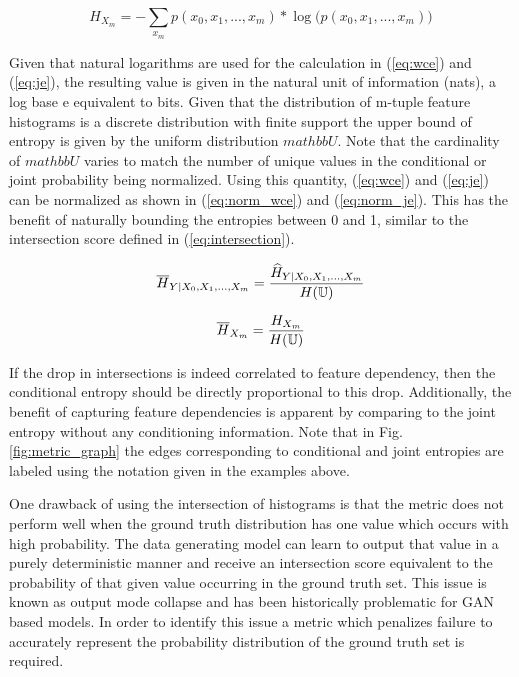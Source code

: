 \begin{equation}
\label{eq:je}
{H}_{X_m} = -\sum_{x_m} p(x_0, x_1,...,x_m)  * \log \big({{p(x_0,x_1,...,x_m)}}\big)
\end{equation}

Given that natural logarithms are used for the calculation in (\ref{eq:wce}) and (\ref{eq:je}), the resulting value is given in the natural unit of information (nats), a log base e equivalent to bits. Given that the distribution of m-tuple feature histograms is a discrete distribution with finite support the upper bound of entropy is given by the uniform distribution $mathbb{U}$. Note that the cardinality of $mathbb{U}$ varies to match the number of unique values in the conditional or joint probability being normalized. Using this quantity, (\ref{eq:wce}) and (\ref{eq:je}) can be normalized as shown in (\ref{eq:norm_wce}) and (\ref{eq:norm_je}). This has the benefit of naturally bounding the entropies between 0 and 1, similar to the intersection score defined in (\ref{eq:intersection}).

\begin{equation}
\label{eq:norm_wce}
\overline{H}_{Y|X_0, X_1, ..., X_m} = {{\widehat{H}_{Y|X_0, X_1, ..., X_m}} \over{ H(\mathbb{U})}}
\end{equation}

\begin{equation}
\label{eq:norm_je}
\overline{H}_{X_m} = {{{H}_{X_m}} \over{ H(\mathbb{U})}}
\end{equation}

If the drop in intersections is indeed correlated to feature dependency, then the conditional entropy should be directly proportional to this drop. Additionally, the benefit of capturing feature dependencies is apparent by comparing to the joint entropy without any conditioning information. Note that in Fig. \ref{fig:metric_graph} the edges corresponding to conditional and joint entropies are labeled using the notation given in the examples above.

One drawback of using the intersection of histograms is that the metric does not perform well when the ground truth distribution has one value which occurs with high probability. The data generating model can learn to output that value in a purely deterministic manner and receive an intersection score equivalent to the probability of that given value occurring in the ground truth set. This issue is known as output mode collapse and has been historically problematic for GAN based models. In order to identify this issue a metric which penalizes failure to accurately represent the probability distribution of the ground truth set is required. 


